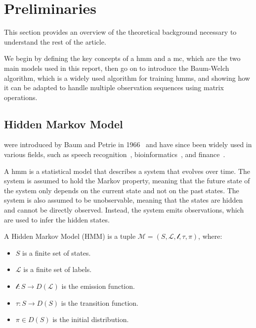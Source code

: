 \section{Preliminaries}\label{sec:preliminaries}
This section provides an overview of the theoretical background necessary to understand the rest of the article.

We begin by defining the key concepts of a \gls{hmm} and a \gls{mc}, which are the two main models used in this report, then go on to introduce the Baum-Welch algorithm, which is a widely used algorithm for training \glspl{hmm}, and showing how it can be adapted to handle multiple observation sequences using matrix operations.

\subsection{Hidden Markov Model}\label{subsec:hmm}
 were introduced by Baum and Petrie in 1966~\cite{baum1966statistical} and have since been widely used in various fields, such as speech recognition~\cite{chavan2013overview}, bioinformatics~\cite{ciocchetta2009bio}, and finance~\cite{mamon2007hidden}.

A \gls{hmm} is a statistical model that describes a system that evolves over time.
The system is assumed to hold the Markov property, meaning that the future state of the system only depends on the current state and not on the past states.
The system is also assumed to be unobservable, meaning that the states are hidden and cannot be directly observed.
Instead, the system emits observations, which are used to infer the hidden states.


\begin{definition}
    A Hidden Markov Model (HMM) is a tuple $\mathcal{M} = (S, \mathcal{L}, \mathscr{l}, \tau,  \pi)$, where:
    \begin{itemize}
        \item $S$ is a finite set of states.
        \item $\mathcal{L}$ is a finite set of labels.
        \item $\mathscr{l}: S \rightarrow D(\mathcal{L})$ is the emission function.
        \item $\tau: S \rightarrow D(S)$ is the transition function.
        \item $\pi \in D(S)$ is the initial distribution.
    \end{itemize}
\end{definition}


